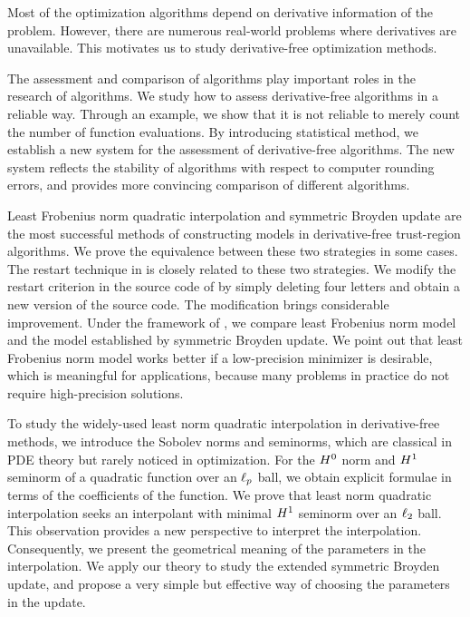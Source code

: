 \begin{englishabstract}
Most of the optimization algorithms depend on derivative information of the
problem. However, there are numerous real-world 
problems where derivatives are unavailable. 
This motivates us to study derivative-free optimization methods.

The assessment and comparison of algorithms play important roles in the 
research of algorithms. We study how to assess derivative-free
algorithms in a reliable way. Through an example, we show that
it is not reliable to merely count the number of function evaluations. 
By introducing statistical method, we establish a new system for the 
assessment of derivative-free algorithms.   
The new system reflects the stability of algorithms with respect to 
computer rounding errors, and provides more convincing comparison of 
different algorithms.

Least Frobenius norm quadratic interpolation and symmetric Broyden update are the most 
successful methods of constructing models in derivative-free trust-region
algorithms. We prove the equivalence between these 
two strategies in some cases. The restart technique in \newuoa is closely 
related to these two strategies. We modify the restart criterion in the
source code of \newuoa by simply deleting four letters and obtain a 
new version of the source code.
The modification brings considerable improvement. Under the framework of \newuoa\!\!,
we compare 
least Frobenius norm model and the 
model established by symmetric Broyden update. We point out that 
least Frobenius norm model works better if a low-precision minimizer 
is desirable, 
which is meaningful for applications, because many 
problems in practice do not require high-precision
solutions.

To study the widely-used least norm quadratic interpolation in derivative-free
methods, we introduce the Sobolev norms and seminorms, which are classical
in PDE theory but rarely noticed in optimization.
For the $\Sob{2}{0}$ norm and $\Sob{2}{1}$
seminorm of a quadratic function over an $\ellp$ ball,  
we obtain explicit formulae in terms of the coefficients of the 
function.
We prove that least norm quadratic interpolation seeks an interpolant
with minimal $\Sob{2}{1}$ seminorm over an $\ellt$ ball.
This observation provides a new perspective to interpret the interpolation.
Consequently, we present the geometrical meaning of 
the parameters in the interpolation. We apply our theory to 
study the extended symmetric Broyden update, and propose a very simple but
effective way of choosing the parameters in the update. 


\end{englishabstract}

